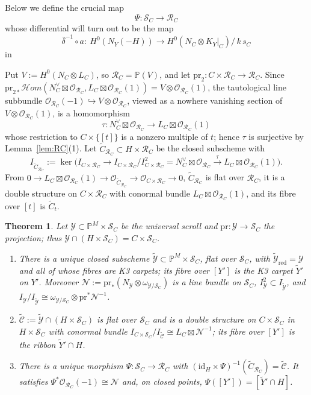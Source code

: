 \documentclass[11pt,twoside]{amsart}
\theoremstyle{plain}
\newtheorem{theorem}{Theorem}[section]
\theoremstyle{definition}
\newcommand{\PP}{\mathbb{P}}
\newcommand{\PM}{\mathbb{P}^M}
\newcommand{\OO}{\mathcal{O}}
\newcommand{\sHom}{\mathcal{H}om}
\newcommand{\id}{\mathrm{id}}
\newcommand{\Yt}{\widetilde{Y}}
\newcommand{\Ct}{\widetilde{C}}
\newcommand{\NY}{N_{Y}}
\newcommand{\SC}{\mathcal{S}_C}
\newcommand{\RC}{\mathcal{R}_C}
\newcommand{\cY}{\mathcal{Y}}
\newcommand{\cYt}{\widetilde{\mathcal{Y}}}
\newcommand{\cCt}{\widetilde{\mathcal{C}}}
\newcommand{\cN}{\mathcal{N}}
\newcommand{\pr}{\mathrm{pr}}
\begin{document}

Below we define the crucial map $$\Psi: \mathcal{S}_C \to \mathcal{R}_C$$ whose differential will turn out to be the map
\begin{equation*}
\bar\delta^{-1}\circ a\colon\ H^0(\NY(-H))\longrightarrow H^0(N_C\otimes K_Y|_C)\big/\,k\,s_C
\end{equation*}
in 

Put $V:=H^0(N_C\otimes L_C)$, so $\RC=\PP(V)$, and let $\pr_2\colon C\times\RC\to\RC$. Since $\pr_{2*}\sHom(N_C^{\vee}\boxtimes\OO_{\RC},L_C\boxtimes\OO_{\RC}(1))=V\otimes\OO_{\RC}(1)$, the tautological line subbundle $\OO_{\RC}(-1)\hookrightarrow V\otimes\OO_{\RC}$, viewed as a nowhere vanishing section of $V\otimes\OO_{\RC}(1)$, is a homomorphism
\begin{equation}\label{universal ribbon}
\tau\colon N_C^{\vee}\boxtimes\OO_{\RC}\longrightarrow L_C\boxtimes\OO_{\RC}(1)
\end{equation}
whose restriction to $C\times\{[t]\}$ is a nonzero multiple of $t$; hence $\tau$ is surjective by Lemma~\ref{lem:RC}(1). Let $\Ct_{\RC}\subset H\times\RC$ be the closed subscheme with
\[
I_{\Ct_{\RC}}:=\ker\big(I_{C\times\RC}\to I_{C\times\RC}/I_{C\times\RC}^2=N_C^{\vee}\boxtimes\OO_{\RC}\xrightarrow{\ \tau\ }L_C\boxtimes\OO_{\RC}(1)\big).
\]
From $0\to L_C\boxtimes\OO_{\RC}(1)\to\OO_{\Ct_{\RC}}\to\OO_{C\times\RC}\to0$, $\Ct_{\RC}$ is flat over $\RC$, it is a double structure on $C\times\RC$ with conormal bundle $L_C\boxtimes\OO_{\RC}(1)$, and its fibre over $[t]$ is $\Ct_t$.

\begin{theorem}\label{thm:Psi}
Let $\cY\subset\PM\times\SC$ be the universal scroll and $\pr\colon\cY\to\SC$ the projection; thus $\cY\cap(H\times\SC)=C\times\SC$.
\begin{enumerate}
\item There is a unique closed subscheme $\cYt\subset\PM\times\SC$, flat over $\SC$, with $\cYt_{\mathrm{red}}=\cY$ and all of whose fibres are K3 carpets; its fibre over $[Y']$ is the K3 carpet $\Yt'$ on $Y'$. Moreover $\cN:=\pr_*(N_{\cY}\otimes\omega_{\cY/\SC})$ is a line bundle on $\SC$, $I_{\cY}^2\subset I_{\cYt}$, and $I_{\cY}/I_{\cYt}\cong\omega_{\cY/\SC}\otimes\pr^*\cN^{-1}$.
\item $\cCt:=\cYt\cap(H\times\SC)$ is flat over $\SC$ and is a double structure on $C\times\SC$ in $H\times\SC$ with conormal bundle $I_{C\times\SC}/I_{\cCt}\cong L_C\boxtimes\cN^{-1}$; its fibre over $[Y']$ is the ribbon $\Yt'\cap H$.
\item There is a unique morphism $\Psi\colon\SC\to\RC$ with $(\id_H\times\Psi)^{-1}(\Ct_{\RC})=\cCt$. It satisfies $\Psi^*\OO_{\RC}(-1)\cong\cN$ and, on closed points, $\Psi([Y'])=[\Yt'\cap H]$.
\end{enumerate}
\end{theorem}
\end{document}
